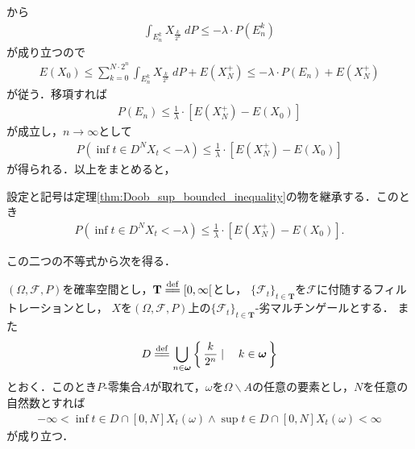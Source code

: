 	から
	\begin{align}
		\int_{E_n^k} X_{\frac{k}{2^n}}\ dP \leq -\lambda \cdot P(E_n^k)
	\end{align}
	が成り立つので
	\begin{align}
		E(X_0) \leq \sum_{k=0}^{N \cdot 2^n} \int_{E_n^k} X_{\frac{k}{2^n}}\ dP + E\left(X_N^+\right)
		\leq -\lambda \cdot P(E_n) + E\left(X_N^+\right)
	\end{align}
	が従う．移項すれば
	\begin{align}
		P\left(E_n\right)
		\leq \frac{1}{\lambda} \cdot \left[E\left(X_N^+\right) - E(X_0)\right]
	\end{align}
	が成立し，$n \longrightarrow \infty$として
	\begin{align}
		P\left(\inf{t \in D^N}{X_t} < -\lambda\right)
		\leq \frac{1}{\lambda} \cdot \left[E\left(X_N^+\right) - E(X_0)\right]
	\end{align}
	が得られる．以上をまとめると，
	
	\begin{screen}
		\begin{thm}[Doobの下限不等式]\label{thm:Doob_inf_bounded_inequality}
			設定と記号は定理\ref{thm:Doob_sup_bounded_inequality}の物を継承する．このとき
			\begin{align}
				P\left(\inf{t \in D^N}{X_t} < -\lambda\right)
				\leq \frac{1}{\lambda} \cdot \left[E\left(X_N^+\right) - E(X_0)\right].
			\end{align}
		\end{thm}
	\end{screen}
	
	この二つの不等式から次を得る．
	
	\begin{screen}
		\begin{thm}[劣マルチンゲールのパスは有界区間上で有界]\label{thm:path_of_submartingale_is_bounded_on_bounded_interval}
			$(\Omega,\mathscr{F},P)$を確率空間とし，$\mathbf{T} \defeq [0,\infty[$とし，
			$\{\mathscr{F}_t\}_{t \in \mathbf{T}}$を$\mathscr{F}$に付随するフィルトレーションとし，
			$X$を$(\Omega,\mathscr{F},P)$上の$\{\mathscr{F}_t\}_{t \in \mathbf{T}}$-劣マルチンゲールとする．
			また
			\begin{align}
				D \defeq \bigcup_{n \in \Natural} \Set{\frac{k}{2^n}}{k \in \Natural}
			\end{align}
			とおく．このとき$P$-零集合$A$が取れて，$\omega$を$\Omega \backslash A$の任意の要素とし，$N$を任意の自然数とすれば
			\begin{align}
				- \infty < \inf{t \in D \cap [0,N]}X_t(\omega) \wedge \sup{t \in D \cap [0,N]}X_t(\omega) < \infty
			\end{align}
			が成り立つ．
		\end{thm}
	\end{screen}
	
